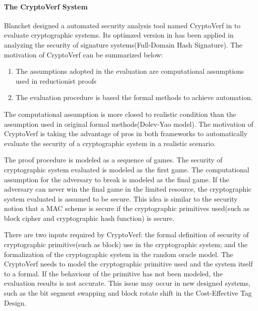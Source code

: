 \documentclass{article}
\begin{document}
\paragraph{The CryptoVerf System}
Blanchet designed a automated security analysis tool named CryptoVerf in \cite{cryptoverf} to evaluate cryptographic systems. Its optimzed version in \cite{auto_verf} has been applied in analyzing the security of signature systems(Full-Domain Hash Signature). 
The motivation of CryptoVerf can be summarized below:
\begin{enumerate}
	\item The assumptions adopted in the evaluation are computational assumptions used in reductionist proofs
	\item The evaluation procedure is based the formal methods to achieve automation.
\end{enumerate}
The computational assumption is more closed to realistic condition than the assumption used in original formal methods(Dolev-Yao model).  The motivation of CryptoVerf is taking the advantage of pros in both frameworks to automatically evaluate the security of a cryptographic system in a realistic scenario. 

The proof procedure is modeled as a sequence of games. The security of cryptographic system evaluated is modeled as the first game. The computational assumption for the adversary to break is modeled as the final game. If the adversary can never win the final game in the limited resource, the cryptographic system evaluated is assumed to be secure. This idea is similar to the security notion that a MAC scheme is secure if the cryptographic primitives used(such as block cipher and cryptographic hash function) is secure.

There are two inputs required by CryptoVerf: the formal definition of security of cryptographic primitive(such as block) use in the cryptographic system; and the formalization of the cryptographic system in the random oracle model. 
The CryptoVerf needs to model the cryptographic primitive used and the system itself to a formal. If the behaviour of the primitive has not been modeled, the evaluation results is not accurate. This issue may occur in new designed systems, such as the bit segment swapping and block rotate shift in the Cost-Effective Tag Design\cite{cetd}.
 

\end{document}

